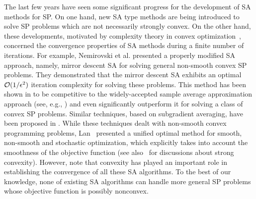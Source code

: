 \documentclass[final]{siamltex}
\begin{document}
The last few years have seen some significant progress for the development of SA methods for SP.
On one hand, new SA type methods are being introduced to solve SP problems which
are not necessarily strongly convex. On the other hand, these developments, motivated by complexity theory
in convex optimization~\cite{nemyud:83},
concerned the convergence properties of SA methods during a finite number of iterations.
For example, Nemirovski et al. \cite{NJLS09-1} presented a properly modified SA approach,
namely, mirror descent SA for solving general non-smooth convex SP problems.
They demonstrated that the mirror descent SA exhibits an
optimal ${\cal O} ( 1 /\epsilon^2)$ iteration complexity for solving
these problems. This method has been shown in  \cite{lns11,NJLS09-1} to be competitive to
the widely-accepted  sample average approximation approach
(see, e.g., \cite{ksh,sha03}) and even significantly
outperform it for solving a class of convex SP problems.
Similar techniques, based on
subgradient averaging, have been proposed in \cite{JNTV05-1,JRT08-1,Nest06-2}.
While these techniques dealt with non-smooth convex programming problems, Lan~\cite{Lan10-3} presented a unified
optimal method for smooth, non-smooth and stochastic optimization,
which explicitly takes into account the smoothness of the objective function
(see also~\cite{GhaLan12-2a,GhaLan10-1b} for discussions about strong convexity).
However, note that convexity has played an important role in establishing
the convergence of all these SA algorithms. To the best of our knowledge,
none of existing SA algorithms can handle more general SP
problems whose objective function is possibly nonconvex.
\end{document}

